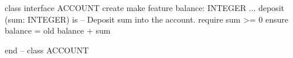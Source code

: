 class interface ACCOUNT create
    make
feature
    balance: INTEGER
    ...
    deposit (sum: INTEGER) is
            -- Deposit sum into the account.
         require
            sum >= 0
         ensure
            balance = old balance + sum

end -- class ACCOUNT